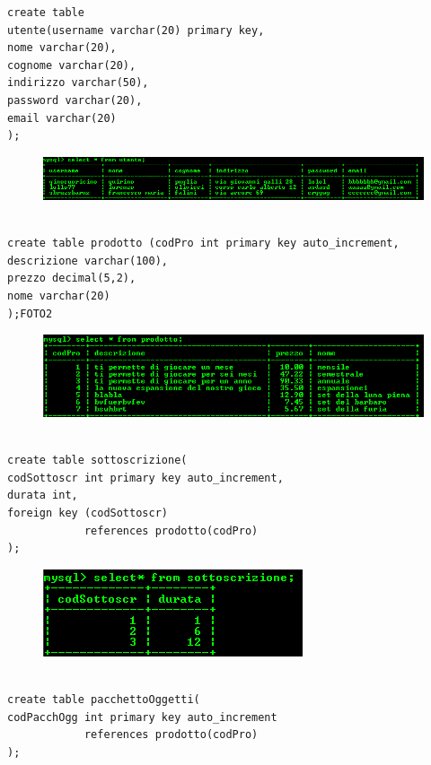 
\begin{verbatim}
create table
utente(username varchar(20) primary key, 
nome varchar(20), 
cognome varchar(20), 
indirizzo varchar(50), 
password varchar(20), 
email varchar(20)
); 

\end{verbatim}

\begin{figure}[H]
\centering
\includegraphics[width=0.7\linewidth]{immagini/1}
\caption{}
\label{fig:1}
\end{figure}

\begin{verbatim}

create table prodotto (codPro int primary key auto_increment, 
descrizione varchar(100), 
prezzo decimal(5,2),
nome varchar(20)
);FOTO2

\end{verbatim}

\begin{figure}[H]
\centering
\includegraphics[width=0.7\linewidth]{immagini/2}
\caption{}
\label{fig:1}
\end{figure}

\begin{verbatim}

create table sottoscrizione( 
codSottoscr int primary key auto_increment, 
durata int, 
foreign key (codSottoscr) 
			references prodotto(codPro)
);
\end{verbatim}

\begin{figure}[H]
\centering
\includegraphics[width=0.7\linewidth]{immagini/3}
\caption{}
\label{fig:1}
\end{figure}

\begin{verbatim}

create table pacchettoOggetti( 
codPacchOgg int primary key auto_increment 
			references prodotto(codPro)
);
\end{verbatim}

